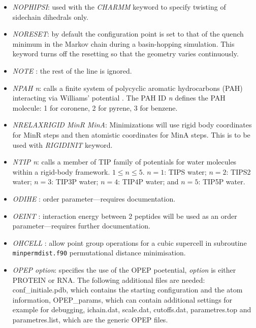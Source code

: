 \documentclass[12pt,a4paper,dvips]{article}
\begin{document}
\begin{itemize}
\item{\it NOPHIPSI}: used with the {\it CHARMM} keyword to specify twisting of 
sidechain dihedrals only.

\item {\it NORESET\/}: by default the configuration point is set to that of the
quench minimum in the Markov chain during a basin-hopping simulation. This
keyword turns off the resetting so that the geometry varies continuously.

\item {\it NOTE \/}: the rest of the line is ignored.

\item {\it NPAH n\/}: calls a finite system of polycyclic aromatic hydrocarbons (PAH) interacting via
Williams' potential \cite{Williams80}. The PAH ID {\it n} defines the PAH molecule: 1 for coronene, 2 for
pyrene, 3 for benzene.

\item {\it NRELAXRIGID MinR MinA\/}: Minimizations will use rigid body coordinates for MinR steps and then atomistic coordinates for MinA steps. This is to be used with {\it RIGIDINIT\/} keyword.

\item {\it NTIP  n\/}: calls a member of TIP family of potentials for water molecules within a rigid-body
framework. $ 1 \le n \le 5$. $n = 1$: TIPS water; $n = 2$: TIPS2 water; $n = 3$: TIP3P water;
$n = 4$: TIP4P water; and $n = 5$: TIP5P water.

\item {\it ODIHE \/}: order parameter---requires documentation.

\item {\it OEINT \/}: interaction energy between 2 peptides will be used as an order parameter---requires 
further documentation.

\item {\it OHCELL \/}: allow point group operations for a cubic
supercell in subroutine {\tt minpermdist.f90} permutational distance minimisation.

\item {\it OPEP option\/}: specifies the use of the OPEP poetential, {\it option\/} is either PROTEIN or RNA. The following additional files are needed:
{\textrm conf\_initiale.pdb}, which contains the starting configuration and the atom information, {\textrm OPEP\_params}, which can contain additional settings for example for debugging,
{\textrm ichain.dat}, {\textrm scale.dat}, {\textrm cutoffs.dat}, {\textrm parametres.top} and {\textrm parametres.list}, which are the generic OPEP files. 


\end{itemize}
\end{document}
